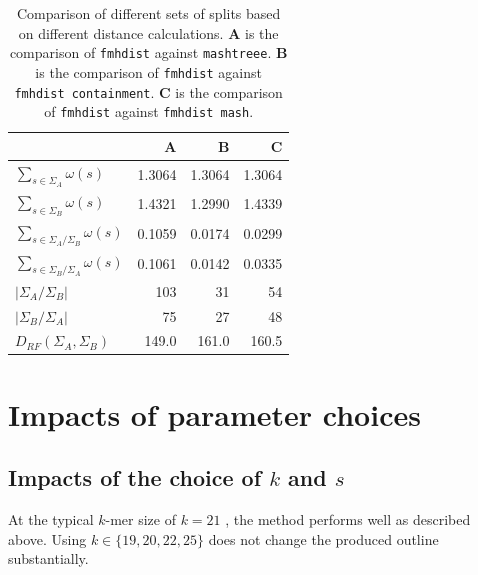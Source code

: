\begin{table}[]
  \centering
  \begin{tabular}{@{}lrrr@{}}
    \toprule
    &  \textbf{A} & \textbf{B} & \textbf{C} \\
    \midrule
  $\sum_{s \in \Sigma_A}{\omega(s)}$           & 1.3064                     & 1.3064                              & 1.3064                         \\
  $\sum_{s \in \Sigma_B}{\omega(s)}$           & 1.4321                     & 1.2990                              & 1.4339                         \\
  $\sum_{s \in \Sigma_A / \Sigma_B}{\omega(s)}$ & 0.1059                    & 0.0174                              & 0.0299                      \\
  $\sum_{s \in \Sigma_B / \Sigma_A}{\omega(s)}$ & 0.1061                    & 0.0142                             & 0.0335                       \\
  $|\Sigma_A / \Sigma_B|$                       & 103                       & 31                                 & 54                                        \\
  $|\Sigma_B / \Sigma_A|$                       & 75                        & 27                                 & 48                                        \\
  $D_{RF}(\Sigma_A, \Sigma_B)$                 & 149.0                       & 161.0                                & 160.5         \\
  \bottomrule                           
  \end{tabular}
  \caption{Comparison of different sets of splits based on different distance
  calculations. \textbf{A} is the comparison of \texttt{fmhdist} against
  \texttt{mashtreee}. \textbf{B} is the comparison of \texttt{fmhdist} against
  \texttt{fmhdist containment}. \textbf{C} is the comparison of \texttt{fmhdist}
  against \texttt{fmhdist mash}.}
  \label{ta:splitDifferences}
\end{table}


\section{Impacts of parameter choices}
\subsection*{Impacts of the choice of $k$ and $s$}
At the typical $k$-mer size of $k=21$
\cite{mandalComparativeGenomeAnalysis2022,ondovMashFastGenome2016,irberLightweightCompositionalAnalysis2022},
the method performs well as described above. Using $k \in \{19, 20, 22, 25\}$
does not change the produced outline substantially. 

